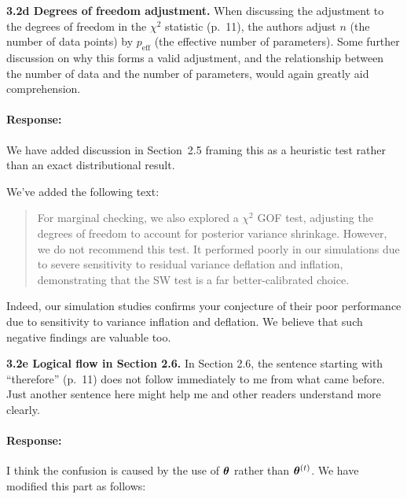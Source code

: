 \documentclass[11pt]{article}
\newcommand*{\mybox}[2]{%
  \par\medskip\noindent
  \colorbox{#1!30}{\parbox{.98\linewidth}{#2}}%
  \par\medskip
}
\begin{document}

\mybox{gray}{\textbf{3.2d Degrees of freedom adjustment.} When discussing the adjustment to the degrees of freedom in the $\chi^2$ statistic (p.~11), the authors adjust $n$ (the number of data points) by $p_{\mathrm{eff}}$ (the effective number of parameters). Some further discussion on why this forms a valid adjustment, and the relationship between the number of data and the number of parameters, would again greatly aid comprehension.}

\paragraph{Response:}
We have added discussion in Section~2.5 framing this as a heuristic test rather than an exact distributional result. 

We've added the following text:

\begin{quote}
For marginal checking, we also explored a $\chi^2$ GOF test, adjusting the degrees of freedom to account for posterior variance shrinkage. However, we do not recommend this test. It performed poorly in our simulations due to severe sensitivity to residual variance deflation and inflation, demonstrating that the SW test is a far better-calibrated choice.
\end{quote}

Indeed, our simulation studies confirms your conjecture of their poor performance due to sensitivity to variance inflation and deflation. We believe that such negative findings are valuable too. 


\mybox{gray}{\textbf{3.2e Logical flow in Section 2.6.} In Section 2.6, the sentence starting with ``therefore'' (p.~11) does not follow immediately to me from what came before. Just another sentence here might help me and other readers understand more clearly.}

\paragraph{Response:}

I think the confusion is caused by the use of $\bm{\theta}$ rather than $\bm{\theta}^{(t)}$. We have modified this part as follows:
\end{document}
